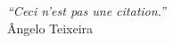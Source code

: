 \cleardoublepage
\thispagestyle{plain}

\vspace*{8cm}

\begin{flushright}
  \textsl{``Ceci n'est pas une citation.''}\\
\vspace*{1.5cm}
    Ângelo Teixeira
\end{flushright}
